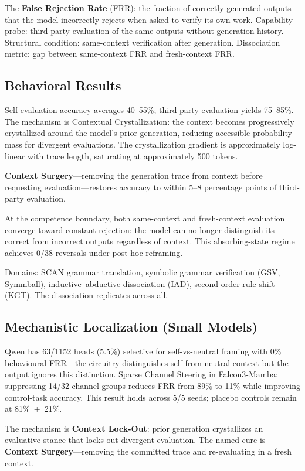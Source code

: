 \documentclass[11pt]{article}
\newcommand{\cc}{Contextual Crystallization}
\begin{document}
The \textbf{False Rejection Rate} (FRR): the fraction of correctly
generated outputs that the model incorrectly rejects when asked to verify
its own work. Capability probe: third-party evaluation of the same
outputs without generation history. Structural condition: same-context
verification after generation. Dissociation metric: gap between
same-context FRR and fresh-context FRR.

\subsection{Behavioral Results}

Self-evaluation accuracy averages 40--55\%; third-party evaluation yields
75--85\%. The mechanism is \cc{}: the context becomes progressively
crystallized around the model's prior generation, reducing accessible
probability mass for divergent evaluations. The crystallization gradient
is approximately log-linear with trace length, saturating at approximately
500 tokens.

\textbf{Context Surgery}---removing the generation trace from context
before requesting evaluation---restores accuracy to within 5--8
percentage points of third-party evaluation.

At the competence boundary, both same-context and fresh-context
evaluation converge toward constant rejection: the model can no longer
distinguish its correct from incorrect outputs regardless of context.
This absorbing-state regime achieves 0/38 reversals under post-hoc
reframing.

Domains: SCAN grammar translation, symbolic grammar verification (GSV,
Symmball), inductive--abductive dissociation (IAD), second-order rule
shift (KGT). The dissociation replicates across all.

\subsection{Mechanistic Localization (Small Models)}

Qwen has 63/1152 heads (5.5\%) selective for self-vs-neutral framing
with 0\% behavioural FRR---the circuitry distinguishes self from
neutral context but the output ignores this distinction. Sparse Channel
Steering in Falcon3-Mamba: suppressing 14/32 channel groups reduces FRR
from 89\% to 11\% while improving control-task accuracy. This result
holds across 5/5 seeds; placebo controls remain at 81\%~$\pm$~21\%.

The mechanism is \textbf{Context Lock-Out}: prior generation crystallizes
an evaluative stance that locks out divergent evaluation. The named cure
is \textbf{Context Surgery}---removing the committed trace and
re-evaluating in a fresh context.
\end{document}
